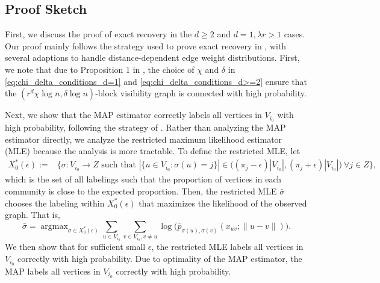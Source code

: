 \documentclass{article}
\DeclareMathOperator*{\argmax}{argmax}
\newcommand{\1}{\mathbbm{1}}
\theoremstyle{definition}
\theoremstyle{plain}
\begin{document}
\subsection{Proof Sketch}
First, we discuss the proof of exact recovery in the $d \geq 2$ and $d = 1, \lambda r > 1$ cases. Our proof mainly follows the strategy used to prove exact recovery in \cite{Gaudio+2025}, with several adaptions to handle distance-dependent edge weight distributions. First, we note that due to Proposition 1 in \cite{GaudioJin2025}, the choice of $\chi$ and $\delta$ in \eqref{eq:chi_delta_conditions_d=1} and \eqref{eq:chi_delta_conditions_d>=2} ensure that the $(r^d \chi \log n, \delta \log n)$-block visibility graph is connected with high probability. 

Next, we show that the MAP estimator correctly labels all vertices in $V_{i_0}$ with high probability, following the strategy of \cite{Gaudio+2025}. Rather than analyzing the MAP estimator directly, we analyze the restricted maximum likelihood estimator (MLE) because the analysis is more tractable. To define the restricted MLE, let 
\begin{equation}
\begin{aligned}
\label{eq:restricted_labeling_set}
    X_0^*(\epsilon) := &\Big\{\sigma : V_{i_0} \to Z \text{ such that } |\{u \in V_{i_0} : \sigma(u) = j\}| \in \Big((\pi_j - \epsilon)|V_{i_0}|, (\pi_j + \epsilon)|V_{i_0}|\Big) \: \forall j \in Z\Big\},
\end{aligned}
\end{equation}
which is the set of all labelings such that the proportion of vertices in each community is close to the expected proportion. Then, the restricted MLE $\bar{\sigma}$ chooses the labeling within $X_0^*(\epsilon)$ that maximizes the likelihood of the observed graph. That is,
\begin{equation}
\label{eq:restricted_MLE}
    \bar{\sigma} = \argmax_{\sigma \in X_0^*(\epsilon)} \sum_{u \in V_{i_0}} \sum_{v \in V_{i_0}, v \neq u} \log\Big(\overline{p}_{\sigma(u), \sigma(v)}(x_{uv}; \|u -v\|)\Big).
\end{equation}
We then show that for sufficient small $\epsilon$, the restricted MLE labels all vertices in $V_{i_0}$ correctly with high probability. Due to optimality of the MAP estimator, the MAP labels all vertices in $V_{i_0}$ correctly with high probability.
\end{document}

